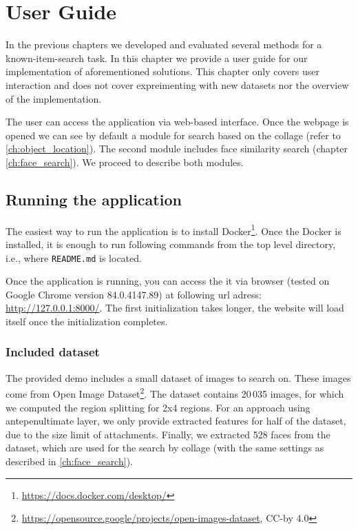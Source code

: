 \chapter{User Guide}
\label{ch:user_guide}

In the previous chapters we developed and evaluated several methods for a known-item-search task. In this chapter we provide a user guide for our implementation of aforementioned solutions. This chapter only covers user interaction and does not cover expreimenting with new datasets nor the overview of the implementation.

The user can access the application via web-based interface. Once the webpage is opened we can see by default a module for search based on the collage (refer to \ref{ch:object_location}). The second module includes face similarity search (chapter \ref{ch:face_search}). We proceed to describe both modules.

\section{Running the application}

The easiest way to run the application is to install Docker\footnote{\url{https://docs.docker.com/desktop/}}. Once the Docker is installed, it is enough to run following commands from the top level directory, i.e., where \verb+README.md+ is located.

\vspace{0.5cm}


\vspace{0.5cm}

Once the application is running, you can access the it via browser (tested on Google Chrome version 84.0.4147.89) at following url adress: \url{http://127.0.0.1:8000/}. The first initialization takes longer, the website will load itself once the initialization completes. 

\subsection*{Included dataset}

The provided demo includes a small dataset of images to search on. These images come from Open Image Dataset\footnote{\url{https://opensource.google/projects/open-images-dataset}, CC-by 4.0}. The dataset contains 20\,035 images, for which we computed the region splitting for 2x4 regions. For an approach using antepenultimate layer, we only provide extracted features for half of the dataset, due to the size limit of attachments. Finally, we extracted 528 faces from the dataset, which are used for the search by collage (with the same settings as described in \autoref{ch:face_search}).

